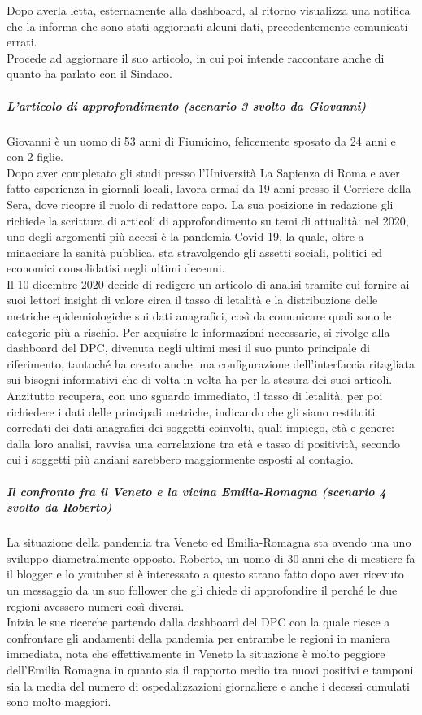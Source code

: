 Dopo averla letta, esternamente alla dashboard, al ritorno visualizza una notifica che la informa che sono stati aggiornati alcuni dati, precedentemente comunicati errati.\\
Procede ad aggiornare il suo articolo, in cui poi intende raccontare anche di quanto ha parlato con il Sindaco.
\noindent
\subparagraph{L'articolo di approfondimento (scenario 3 svolto da Giovanni)}
Giovanni è un uomo di 53 anni di Fiumicino, felicemente sposato da 24 anni e con 2 figlie.\\
Dopo aver completato gli studi presso l'Università La Sapienza di Roma e aver fatto esperienza in giornali locali, lavora ormai da 19 anni presso il Corriere della Sera, dove ricopre il ruolo di redattore capo.
La sua posizione in redazione gli richiede la scrittura di articoli di approfondimento su temi di attualità: nel 2020, uno degli argomenti più accesi è la pandemia Covid-19, la quale, oltre a minacciare la sanità pubblica, sta stravolgendo gli assetti sociali, politici ed economici consolidatisi negli ultimi decenni.\\
Il 10 dicembre 2020 decide di redigere un articolo di analisi tramite cui fornire ai suoi lettori insight di valore circa il tasso di letalità e la distribuzione delle metriche epidemiologiche sui dati anagrafici, così da comunicare quali sono le categorie più a rischio.
Per acquisire le informazioni necessarie, si rivolge alla dashboard del DPC, divenuta negli ultimi mesi il suo punto principale di riferimento, tantoché ha creato anche una configurazione dell'interfaccia ritagliata sui bisogni informativi che di volta in volta ha per la stesura dei suoi articoli.
Anzitutto recupera, con uno sguardo immediato, il tasso di letalità, per poi richiedere i dati delle principali metriche, indicando che gli siano restituiti corredati dei dati anagrafici dei soggetti coinvolti, quali impiego, età e genere: dalla loro analisi, ravvisa una correlazione tra età e tasso di positività, secondo cui i soggetti più anziani sarebbero maggiormente esposti al contagio. 
\noindent
\subparagraph{Il confronto fra il Veneto e la vicina Emilia-Romagna (scenario 4 svolto da Roberto)}
La situazione della pandemia tra Veneto ed Emilia-Romagna sta avendo una uno sviluppo diametralmente opposto.
Roberto, un uomo di 30 anni che di mestiere fa il blogger e lo youtuber si è interessato a questo strano fatto dopo aver ricevuto un messaggio da un suo follower che gli chiede di approfondire il perché le due regioni avessero numeri così diversi.\\
Inizia le sue ricerche partendo dalla dashboard del DPC con la quale riesce a confrontare gli andamenti della pandemia per entrambe le regioni in maniera immediata, nota che effettivamente in Veneto la situazione è molto peggiore dell'Emilia Romagna in quanto sia il rapporto medio tra nuovi positivi e tamponi sia la media del numero di ospedalizzazioni giornaliere e anche i decessi cumulati sono  molto maggiori.
